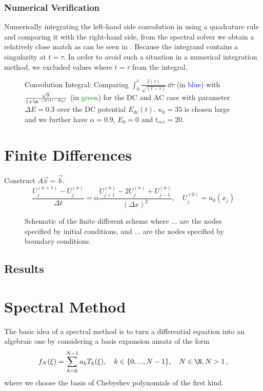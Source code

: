 \documentclass{prettytex/ox/mmsc-special-topic}
\begin{document}
  \subsubsection{Numerical Verification}
  Numerically integrating the left-hand side convolution in  using a quadrature rule and comparing it with the right-hand side, from the spectral solver we obtain a relatively close match as can be seen in .
  Because the integrand contains a singularity at $t = \tau$.
  In order to avoid such a situation in a numerical integration method, we excluded values where $t = \tau$ from the integral.
  \begin{figure}[H]
    \centering
    \caption{Convolution Integral: Comparing $\int_{0}^{t} \frac{I(\tau)}{\sqrt{(t - \tau)}} \,\dd\tau$ (in \textcolor{blue}{blue}) with $\frac{\sqrt{\pi}}{1 + \e^{-(E(t) - E_0)}}$ (in \textcolor{green}{green}) for the DC and AC case with parameter $\Delta E = 0.3$ over the DC potential $E_{dc}(t)$. $\kappa_0 = 35$ is chosen large and we further have $\alpha = 0.9$, $E_0 = 0$ and $t_{rev} = 20$.}
    \label{fig:voltammetry-convolution}
  \end{figure}

  \section{Finite Differences}
  Construct $A \vec{x} = \vec{b}$.
  $$\frac{U_{j}^{(n+1)} - U_{j}^{(n)}}{\Delta t} = \alpha \frac{U_{j+1}^{(n)} - 2 U_{j}^{(n)} + U_{j-1}^{(n)}}{(\Delta x)^2}, \quad U_j^{(0)} = u_0(x_j)$$

  \begin{figure}[H]
    \centering
    \caption{Schematic of the finite different scheme where ... are the nodes specified by initial conditions, and ... are the nodes specified by boundary conditions.}
    \label{fig:fd-scheme}
  \end{figure}

  \subsection{Results}

  \section{Spectral Method}
  The basic idea of a spectral method is to turn a differential equation into an algebraic one by considering a basis expansion ansatz of the form
  \begin{equation}
    f_N(\xi) = \sum_{k=0}^{N-1} a_k T_k(\xi), \quad k \in \{0, ..., N-1\},\quad N \in \N, N > 1\,,
    \label{eq:truncated-cheb-series}
  \end{equation}
  where we choose the basis of Chebyshev polynomials of the first kind.
\end{document}
